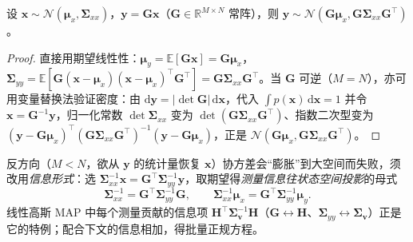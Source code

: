 \begin{proposition}[线性变量替换]\label{prop:lin-change}
设 $\mathbf{x}\sim\mathcal{N}(\boldsymbol{\mu}_x,\boldsymbol{\Sigma}_{xx})$，$\mathbf{y}=\mathbf{G}\mathbf{x}$（$\mathbf{G}\in\mathbb{R}^{M\times N}$ 常阵），则 $\mathbf{y}\sim\mathcal{N}(\mathbf{G}\boldsymbol{\mu}_x,\mathbf{G}\boldsymbol{\Sigma}_{xx}\mathbf{G}^\top)$。
\end{proposition}
\begin{proof}
直接用期望线性性：$\boldsymbol{\mu}_y=\mathbb{E}[\mathbf{G}\mathbf{x}]=\mathbf{G}\boldsymbol{\mu}_x$，$\boldsymbol{\Sigma}_{yy}=\mathbb{E}[\mathbf{G}(\mathbf{x}-\boldsymbol{\mu}_x)(\mathbf{x}-\boldsymbol{\mu}_x)^\top\mathbf{G}^\top]=\mathbf{G}\boldsymbol{\Sigma}_{xx}\mathbf{G}^\top$。当 $\mathbf{G}$ 可逆（$M=N$），亦可用变量替换法验证密度：由 $\mathrm{d}\mathbf{y}=|\det\mathbf{G}|\,\mathrm{d}\mathbf{x}$，代入 $\int p(\mathbf{x})\,\mathrm{d}\mathbf{x}=1$ 并令 $\mathbf{x}=\mathbf{G}^{-1}\mathbf{y}$，归一化常数 $\det\boldsymbol{\Sigma}_{xx}$ 变为 $\det(\mathbf{G}\boldsymbol{\Sigma}_{xx}\mathbf{G}^\top)$、指数二次型变为 $(\mathbf{y}-\mathbf{G}\boldsymbol{\mu}_x)^\top(\mathbf{G}\boldsymbol{\Sigma}_{xx}\mathbf{G}^\top)^{-1}(\mathbf{y}-\mathbf{G}\boldsymbol{\mu}_x)$，正是 $\mathcal{N}(\mathbf{G}\boldsymbol{\mu}_x,\mathbf{G}\boldsymbol{\Sigma}_{xx}\mathbf{G}^\top)$。
\end{proof}
\noindent 反方向（$M<N$，欲从 $\mathbf{y}$ 的统计量恢复 $\mathbf{x}$）协方差会“膨胀”到大空间而失败，须改用\emph{信息形式}：选 $\boldsymbol{\Sigma}_{xx}^{-1}\mathbf{x}=\mathbf{G}^\top\boldsymbol{\Sigma}_{yy}^{-1}\mathbf{y}$，取期望得\emph{测量信息往状态空间投影}的母式
\begin{equation}
  \boldsymbol{\Sigma}_{xx}^{-1}=\mathbf{G}^\top\boldsymbol{\Sigma}_{yy}^{-1}\mathbf{G},\qquad
  \boldsymbol{\Sigma}_{xx}^{-1}\boldsymbol{\mu}_x=\mathbf{G}^\top\boldsymbol{\Sigma}_{yy}^{-1}\boldsymbol{\mu}_y.
  \label{eq:info-project}
\end{equation}
线性高斯 MAP 中每个测量贡献的信息项 $\mathbf{H}^\top\boldsymbol{\Sigma}_{\mathbf{v}}^{-1}\mathbf{H}$（$\mathbf{G}\leftrightarrow\mathbf{H}$、$\boldsymbol{\Sigma}_{yy}\leftrightarrow\boldsymbol{\Sigma}_{\mathbf{v}}$）正是它的特例；配合下文的信息相加，得批量正规方程。

